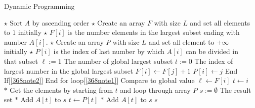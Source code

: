 \setcounter{algorithm}{0}
\begin{algorithm}[H]
\caption{Dynamic Programming}
\begin{algorithmic}[1]
\State $\star$ Sort $A$ by ascending order
\State $\star$ Create an array $F$ with size $L$ and set all elements to $1$ initially
\State $\star$ $F[i]$ is the number elements in the largest subset ending with number $A[i]$. 
\State $\star$ Create an array $P$ with size $L$ and set all element to $+\infty$ initially
\State $\star$ $P[i]$ is the index of last number by which $A[i]$ can be divided in that subset
\State $\ell:=1$ \Comment The number of global largest subset
\State $t:=0$ \Comment The index of largest number in the global largest subset
 \label{368note1}
 \label{368note2}
\State $F[i]\gets F[j]+1$
\State $P[i]\gets j$
\EndIf  \Comment End If[\ref{368note2}]
\EndIf
\EndFor   \Comment End for loop[\ref{368note1}]
 \Comment Compare to global value
\State $\ell\gets F[i]$
\State $t\gets i$
\EndIf
\EndFor
\State $\ast$ Get the elements by starting from $t$ and loop through array $P$
\State $s:=\emptyset$ \Comment The result set
\State $\ast$ Add $A[t]$ to $s$
\State $t\gets P[t]$
\State $\ast$ Add $A[t]$ to $s$
\EndWhile
\State \Return $s$
\EndProcedure
\end{algorithmic}
\end{algorithm}

